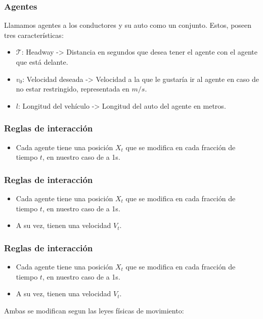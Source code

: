 \documentclass[10pt, compress]{beamer}
\begin{document}
\begin{frame}[fragile]

\frametitle{Agentes}

Llamamos agentes a los conductores y su auto como un conjunto. Estos, poseen tres caracter\'isticas:

\begin{itemize}
\item $\mathcal{T}$: Headway -> Distancia en segundos que desea tener el agente con el agente que est\'a delante.
\item $v_0$: Velocidad deseada -> Velocidad a la que le gustar\'ia ir al agente en caso de no estar restringido, representada en $m/s$.
\item $l$: Longitud del veh\'iculo -> Longitud del auto del agente en metros.
\end{itemize}

\end{frame}

\begin{frame}[fragile]

\frametitle{Reglas de interacci\'on}
\begin{itemize}
\item Cada agente tiene una posici\'on $X_t$ que se modifica en cada fracci\'on de tiempo $t$, en nuestro caso de a 1s.
\end{itemize}


\end{frame}

\begin{frame}[fragile]

\frametitle{Reglas de interacci\'on}
\begin{itemize}
\item Cada agente tiene una posici\'on $X_t$ que se modifica en cada fracci\'on de tiempo $t$, en nuestro caso de a 1s.
\item A su vez, tienen una velocidad $V_t$.
\end{itemize}

\end{frame}

\begin{frame}[fragile]

\frametitle{Reglas de interacci\'on}
\begin{itemize}
\item Cada agente tiene una posici\'on $X_t$ que se modifica en cada fracci\'on de tiempo $t$, en nuestro caso de a 1s.
\item A su vez, tienen una velocidad $V_t$.
\end{itemize}
Ambas se modifican segun las leyes f\'isicas de movimiento:
\end{frame}
\end{document}
